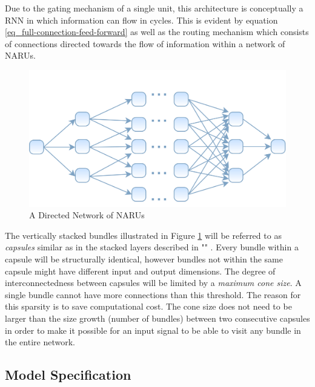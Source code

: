Due to the gating mechanism of a single unit, this architecture is conceptually a \acl{RNN} in which information can flow in cycles. 
This is evident by equation \ref{eq_full-connection-feed-forward} as well
as the routing mechanism which consists of connections directed towards the flow
of information within a network of \acp{NARU}.

\begin{figure}[h]
    \includegraphics[width=\textwidth]{PICs/NARU/directed-naru-net.png}
    
    \caption{A Directed Network of NARUs}
    \label{naru-net}
\end{figure}

The vertically stacked bundles illustrated in
Figure \ref{naru-net} will be referred to 
as \textit{capsules} similar as in the stacked layers described in  "" \cite{15_dynamic-routing-between-capsules_2017}.
Every bundle within a capsule will be structurally
identical, however bundles not within the same
capsule might have different input and output dimensions.\linebreak
The degree of interconnectedness between capsules
will be limited by a \textit{maximum cone size}.
A single bundle cannot have more
connections than this threshold.
The reason for this sparsity is to save 
computational cost. The cone size
does not need to be larger than the 
size growth (number of bundles) between two consecutive capsules in order to
make it possible for an input signal 
to be able to visit any bundle in the entire network.

\clearpage

\subsection{Model Specification}\label{subsec_model-specification}
      
